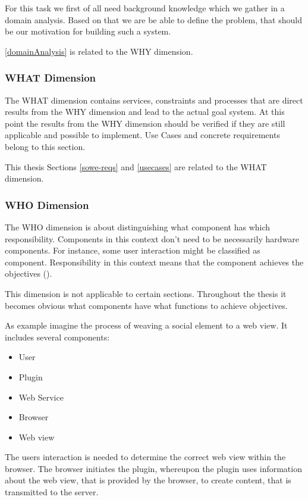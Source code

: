 For this task we first of all need background knowledge which we gather in a domain analysis. Based on that we are be able to define the problem, that should be our motivation for building such a system. 

 \ref{domainAnalysis} is related to the WHY dimension.

\subsubsection{WHAT Dimension}

The WHAT dimension contains services, constraints and processes that are direct results from the WHY dimension and lead to the actual goal system. At this point the results from the WHY dimension should be verified if they are still applicable and possible to implement. Use Cases and concrete requirements belong to this section. 

This thesis Sections \ref{sowe-reqs}  and \ref{usecases}  are related to the WHAT dimension.

\subsubsection{WHO Dimension}

The WHO dimension is about distinguishing what component has which responsibility. Components in this context don't need to be necessarily hardware components. For instance, some user interaction might be classified as component. Responsibility in this context means that the component achieves the objectives (\cite{van2009requirements}).

This dimension is not applicable to certain sections. Throughout the thesis it becomes obvious what components have what functions to achieve objectives. 

As example imagine the process of weaving a social element to a web view. It includes several components:
\begin{itemize}
	\item User
	\item Plugin
	\item Web Service
	\item Browser
	\item Web view
\end{itemize}

The users interaction is needed to determine the correct web view within the browser. The browser initiates the plugin, whereupon the plugin uses information about the web view, that is provided by the browser, to create content, that is transmitted to the server. 

